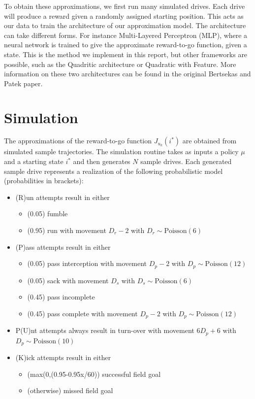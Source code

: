 \documentclass[11pt, oneside]{article}   	%
\begin{document}
To obtain these approximations, we first run many simulated drives. Each drive will produce a reward given a randomly assigned starting position. This acts as our data to train the architecture of our approximation model. The architecture can take different forms. For instance Multi-Layered Perceptron (MLP), where a neural network is trained to give the approximate reward-to-go function, given a state. This is the method we implement in this report, but other frameworks are possible, such as the Quadritic architecture or Quadratic with Feature. More information on these two architectures can be found in the original Bertsekas and Patek paper.

\section{Simulation}
The approximations of the reward-to-go function $J_{u_k}(i^*)$ are obtained from simulated sample trajectories. The simulation routine takes as inputs a policy $\mu$ and a starting state $i^*$ and then generates $N$ sample drives. Each generated sample drive represents a realization of the following probabilistic model (probabilities in brackets):
\begin{itemize}
\item (R)un attempts result in either
\begin{itemize}
\item (0.05) fumble
\item (0.95) run with movement $D_r -2$ with $D_r \sim \text{Poisson}(6)$
\end{itemize}
\item (P)ass attempts result in either
\begin{itemize}
\item (0.05) pass interception with movement $D_p -2$ with $D_p \sim \text{Poisson}(12)$
\item (0.05) sack with movement $D_s$ with $D_s \sim \text{Poisson}(6)$
\item (0.45) pass incomplete
\item (0.45) pass complete with movement $D_p -2$ with $D_p \sim \text{Poisson}(12)$
\end{itemize}
\item P(U)nt attempts always result in turn-over with movement $6 D_p + 6$ with $D_p \sim \text{Poisson}(10)$
\item (K)ick attempts result in either
\begin{itemize}
\item (max(0,(0.95-0.95x/60)) successful field goal
\item (otherwise) missed field goal
\end{itemize}
\end{itemize}
\end{document}
